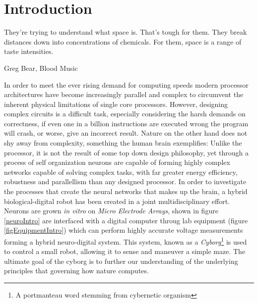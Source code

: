 \chapter{Introduction}
\epigraph{They're trying to understand what space is. That's tough for them.
They break distances down into concentrations of chemicals. For them, space is a
range of taste intensities.}{Greg Bear, Blood Music}
%
In order to meet the ever rising demand for computing speeds modern processor
architectures have become increasingly parallel and complex to circumvent
the inherent physical limitations of single core processors.
%
However, designing complex circuits is a difficult task, especially considering
the harsh demands on correctness, if even one in a billion instructions are
executed wrong the program will crash, or worse, give an incorrect result.
%
Nature on the other hand does not shy away from complexity, something the human
brain exemplifies:
%
Unlike the processor, it is not the result of some top down design
philosophy, yet through a process of self organization neurons are capable of
forming highly complex networks capable of solving complex tasks, with far
greater energy efficiency, robustness and parallellism than any designed
processor.
%
In order to investigate the processes that create the neural networks that makes
up the brain, a hybrid biological-digital robot has been created in a joint
multidisciplinary effort. 
%
Neurons are grown \emph{in vitro} on \emph{Micro Electrode Arrays}, shown in
figure \ref{neuroIntro} are interfaced with a digital computer throug lab
equipment (figure \ref{figEquipmentIntro}) which can perform highly accurate
voltage measurements forming a hybrid neuro-digital system. 
%
This system, known as a \emph{Cyborg}\footnote{A portmanteau word stemming from
  cybernetic organism} is used to control a small robot, allowing it to sense
and maneuver a simple maze.
%
The ultimate goal of the cyborg is to further our understanding of the
underlying principles that governing how nature computes.
%
